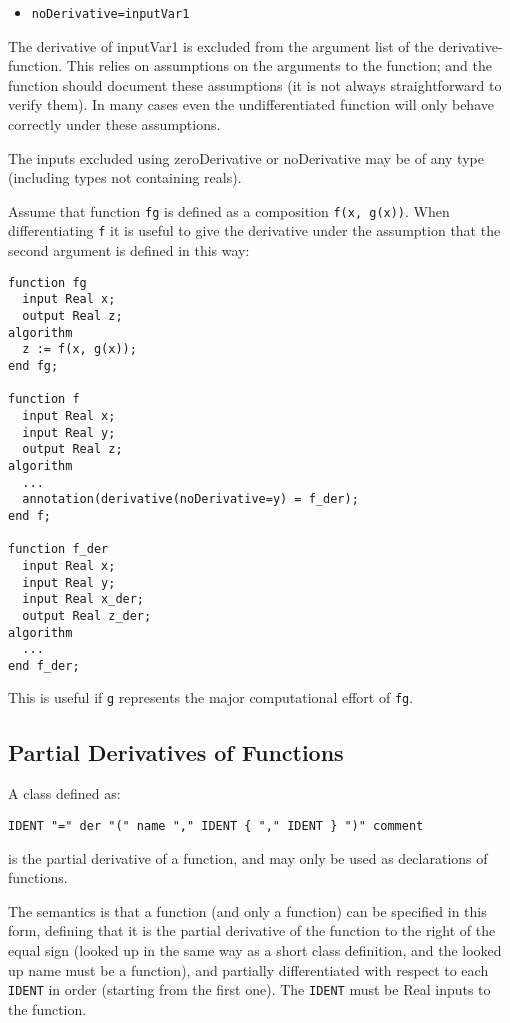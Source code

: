 \begin{itemize}
\item
  \lstinline!noDerivative=inputVar1!
\end{itemize}

The derivative of inputVar1 is excluded from the argument list of the
derivative-function. This relies on assumptions on the arguments to the
function; and the function should document these assumptions (it is not
always straightforward to verify them). In many cases even the
undifferentiated function will only behave correctly under these
assumptions.

The inputs excluded using zeroDerivative or noDerivative may be of any
type (including types not containing reals).

\begin{nonnormative}
Assume that function \lstinline!fg! is defined as a composition \lstinline!f(x, g(x))!.
When differentiating \lstinline!f! it is useful to give the derivative under the
assumption that the second argument is defined in this way:
\begin{lstlisting}[language=modelica]
function fg
  input Real x;
  output Real z;
algorithm
  z := f(x, g(x));
end fg;

function f
  input Real x;
  input Real y;
  output Real z;
algorithm
  ...
  annotation(derivative(noDerivative=y) = f_der);
end f;

function f_der
  input Real x;
  input Real y;
  input Real x_der;
  output Real z_der;
algorithm
  ...
end f_der;
\end{lstlisting}
This is useful if \lstinline!g! represents the major computational
effort of \lstinline!fg!.
\end{nonnormative}

\subsection{Partial Derivatives of Functions}\label{partial-derivatives-of-functions}

A class defined as:
\begin{lstlisting}[language=grammar]
IDENT "=" der "(" name "," IDENT { "," IDENT } ")" comment
\end{lstlisting}
is the partial derivative of a function, and may only be used as
declarations of functions.

The semantics is that a function (and only a function) can be
specified in this form, defining that it is the partial derivative of
the function to the right of the equal sign (looked up in the same way
as a short class definition, and the looked up name must be a function),
and partially differentiated with respect to each \lstinline!IDENT! in order
(starting from the first one). The \lstinline!IDENT! must be Real inputs to the
function.

